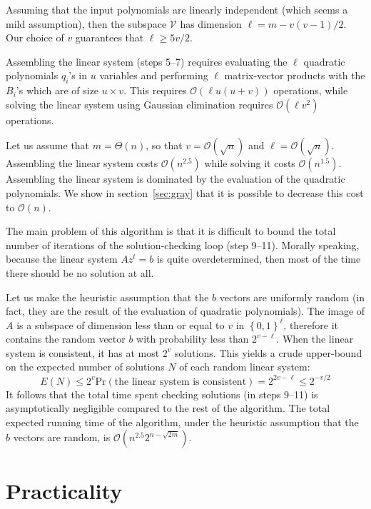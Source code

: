 \documentclass[a4paper,UKenglish,cleveref, autoref]{lipics-v2019}
\newcommand{\bits}{\left\{0, 1\right\}}
\newcommand{\bigO}[1]{\ensuremath{\mathcal{O}\left( #1 \right)} }
\newcommand{\bigTheta}[1]{\ensuremath{\Theta\left( #1 \right)} }
\begin{document}
  Assuming that the input polynomials are linearly independent (which seems a mild
  assumption), then the subspace $\mathcal{V}$ has dimension
  $\ell = m - v(v-1)/2$. Our choice of $v$ guarantees that $\ell \geq 5v/2$.
  
  Assembling the linear system (steps 5--7) requires evaluating the $\ell$
  quadratic polynomials $q_i$'s in $u$ variables and performing $\ell$
  matrix-vector products with the $B_i$'s which are of size $u \times v$.  This
  requires $\bigO{\ell u(u+v)}$ operations, while solving the linear system using
  Gaussian elimination requires $\bigO{\ell v^2}$ operations.
  
  Let us assume that $m = \bigTheta{n}$, so that $v = \bigO{\sqrt{n}}$ and
  $\ell = \bigO{\sqrt{n}}$. Assembling the linear system costs $\bigO{n^{2.5}}$
  while solving it costs $\bigO{n^{1.5}}$. Assembling the linear system is
  dominated by the evaluation of the quadratic polynomials. We show in
  section~\ref{sec:gray} that it is possible to decrease this cost to $\bigO{n}$.
  
  The main problem of this algorithm is that it is difficult to bound the total
  number of iterations of the solution-checking loop (step 9--11). Morally
  speaking, because the linear system $A z^t = b$ is quite overdetermined, then most
  of the time there should be no solution at all.
  
  Let us make the heuristic assumption that the $b$ vectors are uniformly random
  (in fact, they are the result of the evaluation of quadratic polynomials). The
  image of $A$ is a subspace of dimension less than or equal to $v$ in
  $\bits^\ell$, therefore it contains the random vector $b$ with probability less
  than $2^{v-\ell}$. When the linear system is consistent, it has at most $2^v$
  solutions. This yields a crude upper-bound on the expected number of solutions
  $N$ of each random linear system:
  \[
  E(N) \leq 2^v \mathrm{Pr}(\text{the linear system is consistent}) = 2^{2v - \ell} \leq 2^{-v/2}
  \]
  It follows that the total time spent checking solutions (in steps 9--11) is
  asymptotically negligible compared to the rest of the algorithm.  The total
  expected running time of the algorithm, under the heuristic assumption that the
  $b$ vectors are random, is $\bigO{n^{2.5} 2^{n - \sqrt{2m}}}$.
  
  
  \section{Practicality}
  
\end{document}
